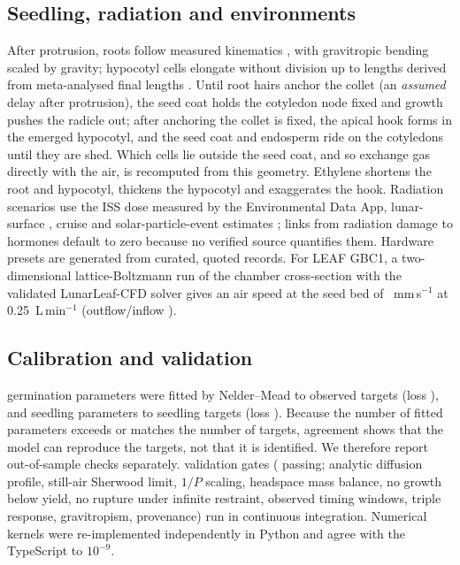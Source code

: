 \documentclass[11pt]{article}
\begin{document}
\subsection{Seedling, radiation and environments}
After protrusion, roots follow measured kinematics \citep{beemster1998}, with gravitropic bending scaled by gravity; hypocotyl cells
elongate without division up to lengths derived from meta-analysed final lengths \citep{alimchandani2026}. Until root hairs anchor the
collet (an \emph{assumed} delay after protrusion), the seed coat holds the cotyledon node fixed and growth pushes the radicle out; after
anchoring the collet is fixed, the apical hook forms in the emerged hypocotyl, and the seed coat and endosperm ride on the cotyledons
until they are shed. Which cells lie outside the seed coat, and so exchange gas directly with the air, is recomputed from this
geometry. Ethylene shortens the root and hypocotyl, thickens the hypocotyl and exaggerates the hook. Radiation scenarios use the ISS dose measured by the Environmental
Data App, lunar-surface \citep{zhang2020}, cruise \citep{simonsen2020} and solar-particle-event estimates \citep{shavers2024}; links
from radiation damage to hormones default to zero because no verified source quantifies them. Hardware presets are generated from
curated, quoted records. For LEAF GBC1, a two-dimensional lattice-Boltzmann run of the chamber cross-section with the validated
LunarLeaf-CFD solver gives an air speed at the seed bed of \GbcULow{}~mm\,s$^{-1}$ at 0.25~L\,min$^{-1}$ (outflow/inflow
\GbcMassLow{}).

\subsection{Calibration and validation}
\FitNFree{} germination parameters were fitted by Nelder--Mead to \FitNTargets{} observed targets (loss \FitLoss{}), and
\SeedFitNFree{} seedling parameters to seedling targets (loss \SeedFitLoss{}). Because the number of fitted parameters exceeds or
matches the number of targets, agreement shows that the model can reproduce the targets, not that it is identified. We therefore report
out-of-sample checks separately. \NGates{} validation gates (\NGatesPassed{} passing; analytic diffusion profile, still-air Sherwood limit, $1/P$ scaling,
headspace mass balance, no growth below yield, no rupture under infinite restraint, observed timing windows, triple response,
gravitropism, provenance) run in continuous integration. Numerical kernels were re-implemented independently in Python and agree
with the TypeScript to $10^{-9}$.
\end{document}
